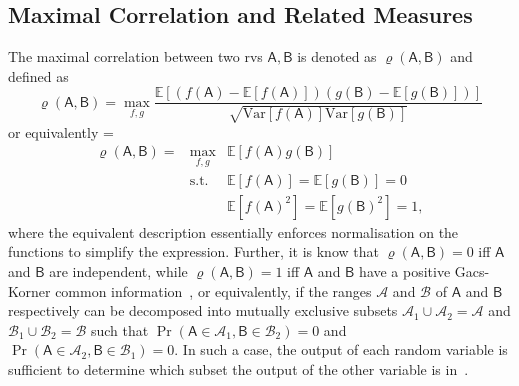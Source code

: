 \documentclass[10pt, a4paper]{article}
\numberwithin{equation}{section} %
\theoremstyle{definition}
\theoremstyle{plain}
\newenvironment{Array}[1] %
{\def\arraystretch{1.75}\everymath={\displaystyle}\begin{equation}\begin{array}{#1}}
{\end{array}\end{equation}}
\newcommand{\?}{\mathrel{?}} %
\newcommand{\E}{\mathbb{E}} %
\newcommand{\Var}{\mathrm{Var}} %
\newcommand{\sA}{\mathcal{A}}
\newcommand{\sB}{\mathcal{B}}
\newcommand{\crv}[1]{\mathsf{#1}}
\begin{document}
                        \subsection{Maximal Correlation and Related Measures}\label{sec:wirmono_maxcorr}

                        The maximal correlation between two rvs \(\crv{A},\crv{B}\) is denoted as \(\varrho(\crv{A},\crv{B})\) and defined as~\cite{NLMonotones}
                        \begin{equation}
                          \varrho(\crv{A},\crv{B}) = \max_{f,g} \frac{\E[(f(\crv{A})-\E[f(\crv{A})])(g(\crv{B})-\E[g(\crv{B})])]}{\sqrt{\Var[f(\crv{A})]\Var[g(\crv{B})]}}
                        \end{equation}
                        or equivalently
                        \begin{Array}{rcl}
                          \varrho(\crv{A},\crv{B}) = & \max_{f,g}  & \E[f(\crv{A})g(\crv{B})] \\
                                                     & \text{s.t.} & \E[f(\crv{A})] = \E[g(\crv{B})] = 0 \\
                                                     &             & \E[f(\crv{A})^2] = \E[g(\crv{B})^2] = 1,
                        \end{Array}%
                        where the equivalent description essentially enforces normalisation on the functions to simplify the expression. Further, it is know that \(\varrho(\crv{A},\crv{B}) = 0\) iff \(\crv{A}\) and \(\crv{B}\) are independent, while \(\varrho(\crv{A},\crv{B}) = 1\) iff \(\crv{A}\) and \(\crv{B}\) have a positive Gacs-Korner common information~\cite{SeqPairsDepRV}, or equivalently, if the ranges \(\sA\) and \(\sB\) of \(\crv{A}\) and \(\crv{B}\) respectively can be decomposed into mutually exclusive subsets \(\sA_1 \cup \sA_2 = \sA\) and \(\sB_1 \cup \sB_2 = \sB\) such that \(\Pr(\crv{A} \in \sA_1, \crv{B} \in \sB_2) = 0\) and \(\Pr(\crv{A} \in \sA_2, \crv{B} \in \sB_1) = 0\). In such a case, the output of each random variable is sufficient to determine which subset the output of the other variable is in~\cite[Sec. V-C]{CorrReview}.
\end{document}
